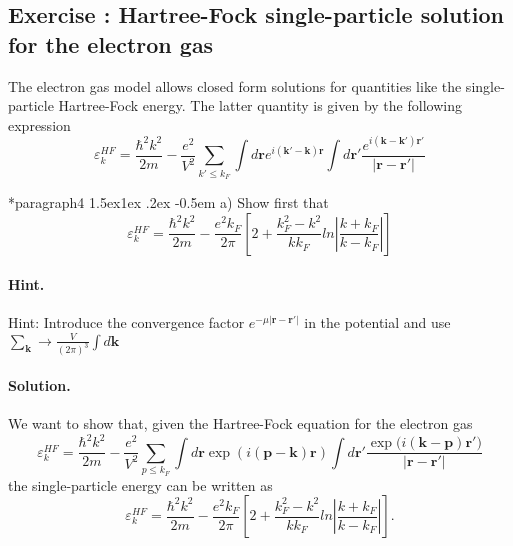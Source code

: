 \documentclass[%
oneside,                 %
final,                   %
10pt]{article}
\makeatletter
\newenvironment{doconceexercise}{}{}
\newcounter{doconceexercisecounter}
\newcommand\subex{\@startsection*{paragraph}{4}{\z@}%
                  {1.5ex\@plus1ex \@minus.2ex}%
                  {-0.5em}%
                  {\normalfont\normalsize\bfseries}}
\makeatother
\begin{document}
\begin{doconceexercise}

\subsection*{Exercise \thedoconceexercisecounter: Hartree-Fock single-particle solution for the electron gas}


The electron gas model allows closed form solutions for quantities like the 
single-particle Hartree-Fock energy.  The latter quantity is given by the following expression
\[
\varepsilon_{k}^{HF}=\frac{\hbar^{2}k^{2}}{2m}-\frac{e^{2}}
{V^{2}}\sum_{k'\leq
k_{F}}\int d\mathbf{r}e^{i(\mathbf{k'}-\mathbf{k})\mathbf{r}}\int
d\mathbf{r}'\frac{e^{i(\mathbf{k}-\mathbf{k'})\mathbf{r}'}}
{\vert\mathbf{r}-\mathbf{r'}\vert}
\]


\subex{a)}
Show first that
\[
\varepsilon_{k}^{HF}=\frac{\hbar^{2}k^{2}}{2m}-\frac{e^{2}
k_{F}}{2\pi}
\left[
2+\frac{k_{F}^{2}-k^{2}}{kk_{F}}ln\left\vert\frac{k+k_{F}}
{k-k_{F}}\right\vert
\right]
\]


\paragraph{Hint.}
Hint: Introduce the convergence factor 
$e^{-\mu\vert\mathbf{r}-\mathbf{r}'\vert}$
in the potential and use  $\sum_{\mathbf{k}}\rightarrow
\frac{V}{(2\pi)^{3}}\int d\mathbf{k}$



\paragraph{Solution.}
We want to show that, given the Hartree-Fock equation for the electron gas
\[
\varepsilon_{k}^{HF}=\frac{\hbar^{2}k^{2}}{2m}-\frac{e^{2}}
{V^{2}}\sum_{p\leq
k_{F}}\int d\mathbf{r}\exp{(i(\mathbf{p}-\mathbf{k})\mathbf{r})}\int
d\mathbf{r}'\frac{\exp{(i(\mathbf{k}-\mathbf{p})\mathbf{r}'})}
{\vert\mathbf{r}-\mathbf{r'}\vert}
\]
the single-particle energy can be written as
\[
\varepsilon_{k}^{HF}=\frac{\hbar^{2}k^{2}}{2m}-\frac{e^{2}
k_{F}}{2\pi}
\left[
2+\frac{k_{F}^{2}-k^{2}}{kk_{F}}ln\left\vert\frac{k+k_{F}}
{k-k_{F}}\right\vert
\right].
\]


\end{doconceexercise}
\end{document}
